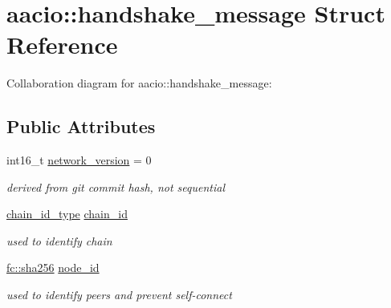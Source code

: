\hypertarget{structaacio_1_1handshake__message}{}\section{aacio\+:\+:handshake\+\_\+message Struct Reference}
\label{structaacio_1_1handshake__message}


Collaboration diagram for aacio\+:\+:handshake\+\_\+message\+:
\subsection*{Public Attributes}
\begin{DoxyCompactItemize}
\item 
\mbox{\label{structaacio_1_1handshake__message_a2fa5199e5e23a924e09b131f25e1f80e}} 
int16\+\_\+t \mbox{\hyperlink{structaacio_1_1handshake__message_a2fa5199e5e23a924e09b131f25e1f80e}{network\+\_\+version}} = 0
\begin{DoxyCompactList}\small\item\em derived from git commit hash, not sequential \end{DoxyCompactList}\item 
\mbox{\label{structaacio_1_1handshake__message_ad86f35588c44ced2715c9d5a401e9066}} 
\mbox{\hyperlink{classfc_1_1sha256}{chain\+\_\+id\+\_\+type}} \mbox{\hyperlink{structaacio_1_1handshake__message_ad86f35588c44ced2715c9d5a401e9066}{chain\+\_\+id}}
\begin{DoxyCompactList}\small\item\em used to identify chain \end{DoxyCompactList}\item 
\mbox{\label{structaacio_1_1handshake__message_ab68e60b93488b08cb281cba0499c9a92}} 
\mbox{\hyperlink{classfc_1_1sha256}{fc\+::sha256}} \mbox{\hyperlink{structaacio_1_1handshake__message_ab68e60b93488b08cb281cba0499c9a92}{node\+\_\+id}}
\begin{DoxyCompactList}\small\item\em used to identify peers and prevent self-\/connect \end{DoxyCompactList}\item 
\mbox{\label{structaacio_1_1handshake__message_afdf5639e2ce584e8e701cb1c18f0d051}} 

\end{DoxyCompactItemize}

